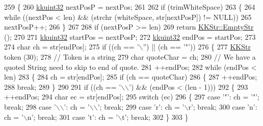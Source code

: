 \begin{DoxyCode}
259 \{
260   \hyperlink{namespace_k_k_b_af8d832f05c54994a1cce25bd5743e19a}{kkuint32}  nextPosP = nextPos;
261 
262   \textcolor{keywordflow}{if}  (trimWhiteSpace)
263   \{
264     \textcolor{keywordflow}{while}  ((nextPos < len)  &&  (strchr (whiteSpace, str[nextPosP]) != NULL))
265       nextPosP++;
266   \}
267 
268   \textcolor{keywordflow}{if} (nextPosP >= len)
269     \textcolor{keywordflow}{return} \hyperlink{class_k_k_b_1_1_k_k_str_ab6e416b3ef54ef632bd10c3f7a2f7994}{KKStr::EmptyStr} ();
270 
271   \hyperlink{namespace_k_k_b_af8d832f05c54994a1cce25bd5743e19a}{kkuint32}  startPos = nextPosP;
272   \hyperlink{namespace_k_k_b_af8d832f05c54994a1cce25bd5743e19a}{kkuint32}  endPos   = startPos;
273 
274   \textcolor{keywordtype}{char} ch = str[endPos];
275   \textcolor{keywordflow}{if}  ((ch == \textcolor{charliteral}{'\(\backslash\)''})  ||  (ch == \textcolor{charliteral}{'"'}))
276   \{
277     \hyperlink{class_k_k_b_1_1_k_k_str}{KKStr}  token (30);
278     \textcolor{comment}{// Token is a string}
279     \textcolor{keywordtype}{char}  quoteChar = ch;
280     \textcolor{comment}{// We have a quoted String need to skip to end of quote.}
281     ++endPos;
282     \textcolor{keywordflow}{while}  (endPos < len)
283     \{
284       ch = str[endPos];
285       \textcolor{keywordflow}{if}  (ch == quoteChar)
286       \{
287         ++endPos;
288         \textcolor{keywordflow}{break};
289       \}
290 
291       \textcolor{keywordflow}{if}  ((ch == \textcolor{charliteral}{'\(\backslash\)\(\backslash\)'})  &&  (endPos < (len - 1)))
292       \{
293         ++endPos;
294         \textcolor{keywordtype}{char}  ec = str[endPos];
295         \textcolor{keywordflow}{switch}  (ec)
296         \{
297         \textcolor{keywordflow}{case}  \textcolor{charliteral}{'"'}:  ch =  \textcolor{charliteral}{'"'};  \textcolor{keywordflow}{break};
298         \textcolor{keywordflow}{case} \textcolor{charliteral}{'\(\backslash\)\(\backslash\)'}:  ch = \textcolor{charliteral}{'\(\backslash\)\(\backslash\)'};  \textcolor{keywordflow}{break};
299         \textcolor{keywordflow}{case}  \textcolor{charliteral}{'r'}:  ch = \textcolor{charliteral}{'\(\backslash\)r'};  \textcolor{keywordflow}{break};
300         \textcolor{keywordflow}{case}  \textcolor{charliteral}{'n'}:  ch = \textcolor{charliteral}{'\(\backslash\)n'};  \textcolor{keywordflow}{break};
301         \textcolor{keywordflow}{case}  \textcolor{charliteral}{'t'}:  ch = \textcolor{charliteral}{'\(\backslash\)t'};  \textcolor{keywordflow}{break};
302         \}
303       \}

\end{DoxyCode}
